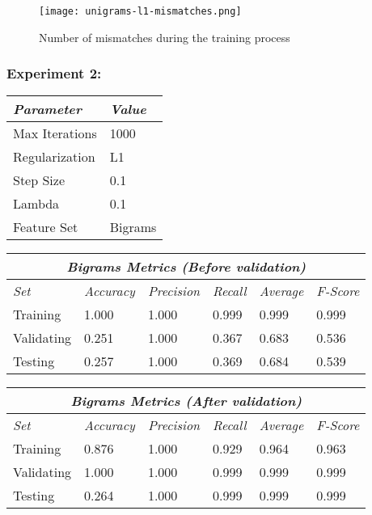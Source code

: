 \documentclass[11pt]{article}
\begin{document}
\begin{figure}[H]
  \caption{Number of mismatches during the training process}
  \texttt{[image: unigrams-l1-mismatches.png]}
  \centering
\end{figure}


\clearpage
\subsubsection*{Experiment 2:}

\begin{table}[H]
\centering
\begin{tabular}{ |p{3cm}||p{2cm}|  }
 \hline
 \textit{Parameter} & \textit{Value} \\
 \hline
 Max Iterations   & 1000 \\
 Regularization & L1 \\
 Step Size    & 0.1 \\
 Lambda    & 0.1 \\
 Feature Set    & Bigrams \\
 \hline
\end{tabular}
\end{table}

\begin{table}[H]
\centering
\begin{tabular}{ |p{2cm}||p{2cm}|p{2cm}|p{2cm}|p{2cm}|p{2cm}|  }
 \hline
 \multicolumn{6}{|c|}{\textbf{\textit{Bigrams Metrics (Before validation)}}} \\
 \hline
 \textit{Set} & \textit{Accuracy} & \textit{Precision} & \textit{Recall} & \textit{Average} & \textit{F-Score} \\
 \hline
 Training   & 1.000 & 1.000 & 0.999 & 0.999 & 0.999 \\
 Validating & 0.251 & 1.000 & 0.367 & 0.683 & 0.536 \\
 Testing    & 0.257 & 1.000 & 0.369 & 0.684 & 0.539 \\
 \hline
\end{tabular}
\end{table}

\begin{table}[H]
\centering
\begin{tabular}{ |p{2cm}||p{2cm}|p{2cm}|p{2cm}|p{2cm}|p{2cm}|  }
 \hline
 \multicolumn{6}{|c|}{\textbf{\textit{Bigrams Metrics (After validation)}}} \\
 \hline
 \textit{Set} & \textit{Accuracy} & \textit{Precision} & \textit{Recall} & \textit{Average} & \textit{F-Score} \\
 \hline
 Training   & 0.876 & 1.000 & 0.929 & 0.964 & 0.963 \\
 Validating & 1.000 & 1.000 & 0.999 & 0.999 & 0.999 \\
 Testing    & 0.264 & 1.000 & 0.999 & 0.999 & 0.999 \\
 \hline
\end{tabular}
\end{table}
\end{document}
